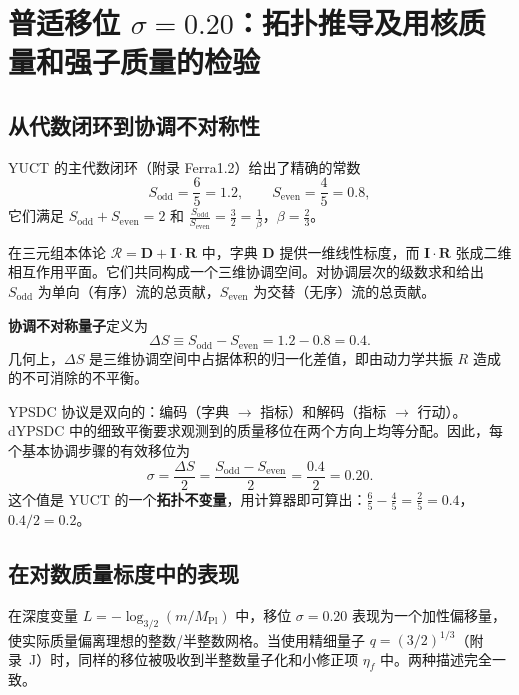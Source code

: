 \documentclass[11pt,a4paper]{article}
\theoremstyle{remark}
\begin{document}
	\section{普适移位 \(\sigma = 0.20\)：拓扑推导及用核质量和强子质量的检验}
	\label{sec:sigma}
	
	\subsection{从代数闭环到协调不对称性}
	
	YUCT 的主代数闭环（附录 Ferra1.2）给出了精确的常数
	\begin{equation}
		S_{\mathrm{odd}} = \frac{6}{5} = 1.2,\qquad S_{\mathrm{even}} = \frac{4}{5} = 0.8,
	\end{equation}
	它们满足 \(\displaystyle S_{\mathrm{odd}}+S_{\mathrm{even}}=2\) 和 \(\displaystyle \frac{S_{\mathrm{odd}}}{S_{\mathrm{even}}}=\frac{3}{2}=\frac{1}{\beta}\)，\(\beta=\frac{2}{3}\)。
	
	在三元组本体论 \(\mathcal{R}=\mathbf{D}+\mathbf{I}\!\cdot\!\mathbf{R}\) 中，字典 \(\mathbf{D}\) 提供一维线性标度，而 \(\mathbf{I}\!\cdot\!\mathbf{R}\) 张成二维相互作用平面。它们共同构成一个三维协调空间。对协调层次的级数求和给出 \(S_{\mathrm{odd}}\) 为单向（有序）流的总贡献，\(S_{\mathrm{even}}\) 为交替（无序）流的总贡献。
	
	\textbf{协调不对称量子}定义为
	\begin{equation}
		\Delta S \equiv S_{\mathrm{odd}} - S_{\mathrm{even}} = 1.2 - 0.8 = 0.4.
		\label{eq:DS}
	\end{equation}
	几何上，\(\Delta S\) 是三维协调空间中占据体积的归一化差值，即由动力学共振 \(R\) 造成的不可消除的不平衡。
	
	YPSDC 协议是双向的：编码（字典 \(\to\) 指标）和解码（指标 \(\to\) 行动）。dYPSDC 中的细致平衡要求观测到的质量移位在两个方向上均等分配。因此，每个基本协调步骤的有效移位为
	\begin{equation}
		\boxed{\sigma = \frac{\Delta S}{2} = \frac{S_{\mathrm{odd}} - S_{\mathrm{even}}}{2} = \frac{0.4}{2} = 0.20.}
		\label{eq:sigma}
	\end{equation}
	这个值是 YUCT 的一个\textbf{拓扑不变量}，用计算器即可算出：\(\frac{6}{5} - \frac{4}{5} = \frac{2}{5} = 0.4\)，\(0.4/2 = 0.2\)。
	
	\subsection{在对数质量标度中的表现}
	
	在深度变量 \(L = -\log_{3/2}(m/M_{\mathrm{Pl}})\) 中，移位 \(\sigma = 0.20\) 表现为一个加性偏移量，使实际质量偏离理想的整数/半整数网格。当使用精细量子 \(q = (3/2)^{1/3}\)（附录~J）时，同样的移位被吸收到半整数量子化和小修正项 \(\eta_f\) 中。两种描述完全一致。
	
\end{document}
